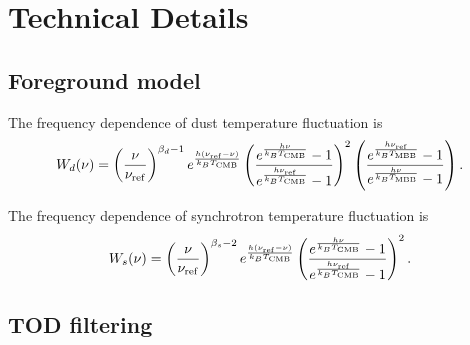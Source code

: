 \documentclass[12pt, a4paper]{ctexart} %
\begin{document}
\section{Technical Details}

\subsection{Foreground model}

The frequency dependence of dust temperature fluctuation is
\begin{equation}
  W_d(\nu) = \left(\frac{\nu}{\nu_{\rm ref}}\right)^{\beta_d-1}e^{\frac{h(\nu_{\rm ref} - \nu)}{k_BT_{\rm CMB}}}\left(\frac{e^{\frac{h\nu}{k_BT_{\rm CMB}}}-1}{e^{\frac{h\nu_{\rm ref}}{k_BT_{\rm CMB}}}-1}\right)^2 \left(\frac{e^{\frac{h\nu_{\rm ref}}{k_BT_{\rm MBB}}}-1}{e^{\frac{h\nu}{k_BT_{\rm MBB}}}-1}\right).
\end{equation}

The frequency dependence of synchrotron temperature fluctuation is
\begin{equation}
  W_s(\nu) = \left(\frac{\nu}{\nu_{\rm ref}}\right)^{\beta_s-2}e^{\frac{h(\nu_{\rm ref} - \nu)}{k_BT_{\rm CMB}}}\left(\frac{e^{\frac{h\nu}{k_BT_{\rm CMB}}}-1}{e^{\frac{h\nu_{\rm ref}}{k_BT_{\rm CMB}}}-1}\right)^2.
\end{equation}

\subsection{TOD filtering}


 
\end{document}
